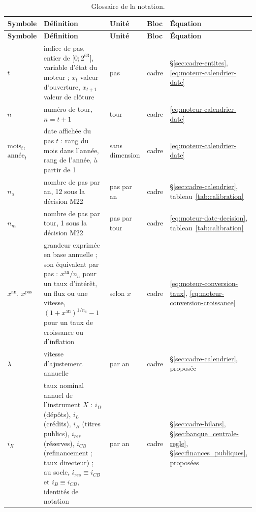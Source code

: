 \documentclass[11pt,a4paper]{article}
\begin{document}
\begin{center}\small
\begin{longtable}{>{\raggedright\arraybackslash}p{1.6cm}>{\raggedright\arraybackslash}p{5.6cm}>{\raggedright\arraybackslash}p{2.0cm}>{\raggedright\arraybackslash}p{2.2cm}>{\raggedright\arraybackslash}p{2.8cm}}
\caption{Glossaire de la notation.}\label{tab:symboles}\\
\toprule
\textbf{Symbole} & \textbf{Définition} & \textbf{Unité} & \textbf{Bloc} & \textbf{Équation}\\
\midrule
\endfirsthead
\toprule
\textbf{Symbole} & \textbf{Définition} & \textbf{Unité} & \textbf{Bloc} & \textbf{Équation}\\
\midrule
\endhead
$t$ & indice de pas, entier de $[0 ; 2^{63}[$, variable d'état du moteur ; $x_t$ valeur d'ouverture, $x_{t+1}$ valeur de clôture & pas & cadre & \S\ref{sec:cadre-entites}, \eqref{eq:moteur-calendrier-date}\\
$n$ & numéro de tour, $n = t + 1$ & tour & cadre & \eqref{eq:moteur-calendrier-date}\\
$\text{mois}_t$, $\text{année}_t$ & date affichée du pas $t$ : rang du mois dans l'année, rang de l'année, à partir de 1 & sans dimension & cadre & \eqref{eq:moteur-calendrier-date}\\
$n_a$ & nombre de pas par an, 12 sous la décision M22 & pas par an & cadre & \S\ref{sec:cadre-calendrier}, tableau~\ref{tab:calibration}\\
$n_m$ & nombre de pas par tour, 1 sous la décision M22 & pas par tour & cadre & \eqref{eq:moteur-date-decision}, tableau~\ref{tab:calibration}\\
$x^{\mathrm{an}}$, $x^{\mathrm{pas}}$ & grandeur exprimée en base annuelle ; son équivalent par pas : $x^{\mathrm{an}}/n_a$ pour un taux d'intérêt, un flux ou une vitesse, $(1 + x^{\mathrm{an}})^{1/n_a} - 1$ pour un taux de croissance ou d'inflation & selon $x$ & cadre & \eqref{eq:moteur-conversion-taux}, \eqref{eq:moteur-conversion-croissance}\\
$\lambda$ & vitesse d'ajustement annuelle & par an & cadre & \S\ref{sec:cadre-calendrier}, proposée\\
$i_X$ & taux nominal annuel de l'instrument $X$ : $i_D$ (dépôts), $i_L$ (crédits), $i_B$ (titres publics), $i_{\mathit{res}}$ (réserves), $i_{\mathit{CB}}$ (refinancement ; taux directeur) ; au socle, $i_{\mathit{res}} \equiv i_{\mathit{CB}}$ et $i_B \equiv i_{\mathit{CB}}$, identités de notation & par an & cadre & \S\ref{sec:cadre-bilans}, \S\ref{sec:banque_centrale-regle}, \S\ref{sec:finances_publiques}, proposées\\

\end{longtable}
\end{center}
\end{document}
